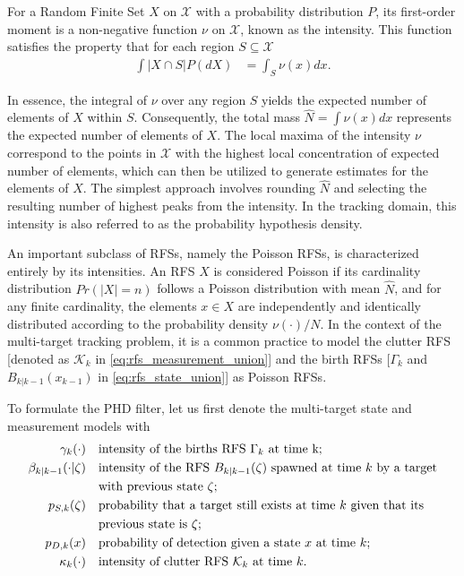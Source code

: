 For a Random Finite Set $X$ on $\mathcal{X}$ with a probability distribution $P$, its first-order moment is a
non-negative function $\nu$ on $\mathcal{X}$, known as the intensity. This function satisfies the property that for
each region $S \subseteq \mathcal{X}$ \cite{daley2003}
\begin{align}
    \int |X \cap S | P(dX) &= \int_S \nu(x)dx.
\end{align}

In essence, the integral of $\nu$ over any region $S$ yields the expected number of elements of $X$ within $S$.
Consequently, the total mass $\hat{N} = \int \nu(x)dx$ represents the expected number of elements of $X$. The local
maxima of the intensity $\nu$ correspond to the points in $\mathcal{X}$ with the highest local concentration of expected
number of elements, which can then be utilized to generate estimates for the elements of $X$. The simplest approach involves rounding $\hat{N}$ and selecting the resulting number of highest peaks from the intensity. In the tracking domain, this intensity is also referred to as the probability hypothesis density.

An important subclass of RFSs, namely the Poisson RFSs, is characterized entirely by its intensities. An RFS $X$ is
considered Poisson if its cardinality distribution $Pr(|X| = n)$ follows a Poisson distribution with mean $\hat{N}$,
and for any finite cardinality, the elements $x \in X$ are independently and identically distributed according to
the probability density $\nu(\cdot)/N$. In the context of the multi-target tracking problem, it is a common practice
to model the clutter RFS [denoted as $\mathcal{K}_k$ in \eqref{eq:rfs_measurement_union}] and the birth RFSs [$\Gamma
_k $
and $B_{k|k-1}(x_{k-1})$ in \eqref{eq:rfs_state_union}] as Poisson RFSs.

To formulate the PHD filter, let us first denote the multi-target state and measurement models with
\begin{align}
    \gamma_k(\cdot) \quad & \text{intensity of the births RFS $\Gamma_k$ at time k;} \\
    \beta_{k|k-1}(\cdot|\zeta) \quad & \text{intensity of the RFS $B_{k|k-1}(\zeta)$ spawned at time $k$ by a target} \notag \\
                                 \quad &  \text{with previous state $\zeta$;} \\
    p_{S,k}(\zeta) \quad & \text{probability that a target still exists at time $k$ given that its } \notag \\
                    \quad & \text{previous state is $\zeta$;} \\
    p_{D,k}(x) \quad & \text{probability of detection given a state $x$ at time $k$;} \\
    \kappa_k(\cdot) \quad & \text{intensity of clutter RFS $\mathcal{K}_k$ at time $k$}.
\end{align}

